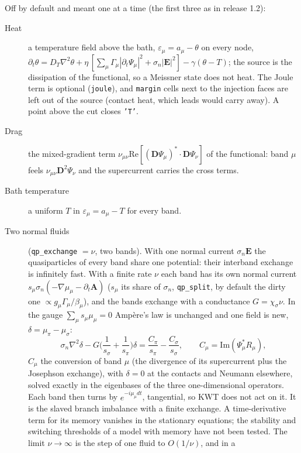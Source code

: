 \documentclass[11pt,a4paper]{article}
\newcommand{\code}[1]{\texttt{#1}}
\begin{document}
Off by default and meant one at a time (the first three as in release 1.2):
\begin{description}
\item[Heat] a temperature field above the bath, $\varepsilon_\mu = a_\mu - \theta$ on every node,
  $\partial_t\theta = D_T\nabla^2\theta + \eta\,[\sum_\mu\Gamma_\mu|\partial_t\Psi_\mu|^2 + \sigma_n|\mathbf E|^2]
  - \gamma(\theta - T)$; the source is the dissipation of the functional, so a Meissner state does not heat. The Joule
  term is optional (\code{joule}), and \code{margin} cells next to the injection faces are left out of the source
  (contact heat, which leads would carry away). A point above the cut closes \code{'T'}.
\item[Drag] the mixed-gradient term $\nu_{\mu\nu}\mathrm{Re}[(\mathbf D\Psi_\mu)^*\cdot\mathbf D\Psi_\nu]$ of the
  functional: band $\mu$ feels $\nu_{\mu\nu}\mathbf D^2\Psi_\nu$ and the supercurrent carries the cross terms.
\item[Bath temperature] a uniform $T$ in $\varepsilon_\mu = a_\mu - T$ for every band.
\item[Two normal fluids] (\code{qp\_exchange} $=\nu$, two bands). With one normal current $\sigma_n\mathbf E$ the
  quasiparticles of every band share one potential: their interband exchange is infinitely fast. With a finite rate $\nu$
  each band has its own normal current $s_\mu\sigma_n(-\nabla\mu_\mu - \partial_t\mathbf A)$ ($s_\mu$ its share of
  $\sigma_n$, \code{qp\_split}, by default the dirty one $\propto g_\mu\Gamma_\mu/\beta_\mu$), and the bands exchange with
  a conductance $G = \chi_\sigma\nu$. In the gauge $\sum_\mu s_\mu\mu_\mu = 0$ Amp\`ere's law is unchanged and one field is
  new, $\delta = \mu_\pi - \mu_\sigma$:
  \begin{equation}
    \sigma_n\nabla^2\delta - G\Big(\frac{1}{s_\sigma} + \frac{1}{s_\pi}\Big)\delta = \frac{C_\pi}{s_\pi} - \frac{C_\sigma}{s_\sigma},
    \qquad C_\mu = \mathrm{Im}(\Psi_\mu^* R_\mu),
  \end{equation}
  $C_\mu$ the conversion of band $\mu$ (the divergence of its supercurrent plus the Josephson exchange), with $\delta = 0$ at
  the contacts and Neumann elsewhere, solved exactly in the eigenbases of the three one-dimensional operators. Each band
  then turns by $e^{-i\mu_\mu dt}$, tangential, so KWT does not act on it. It is the slaved branch imbalance with a finite
  exchange. A time-derivative term for its memory vanishes in the stationary equations; the stability and switching
  thresholds of a model with memory have not been tested. The limit $\nu\to\infty$ is the step of one fluid to $O(1/\nu)$, and in a

\end{description}
\end{document}

